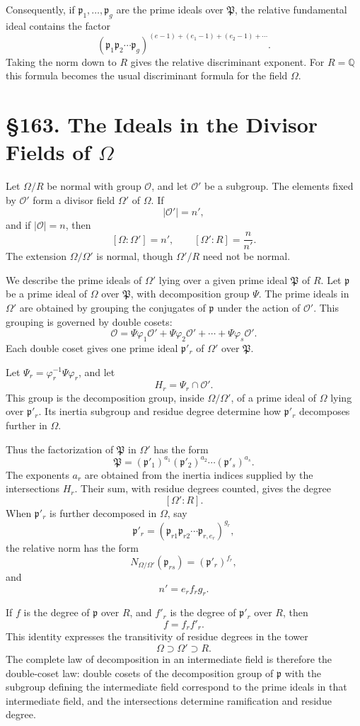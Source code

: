 \documentclass[12pt,a4paper]{article}
\newcommand{\webersection}[2]{\clearpage\section*{\S #1. #2}}
\newcommand{\Pgr}{\mathfrak P}
\newcommand{\p}{\mathfrak p}
\begin{document}
Consequently, if \(\p_1,\ldots,\p_g\) are the prime ideals over \(\Pgr\), the relative fundamental ideal contains the factor
\[
  (\p_1\p_2\cdots\p_g)^{(e-1)+(e_1-1)+(e_2-1)+\cdots}.
\tag{7}
\]
Taking the norm down to \(R\) gives the relative discriminant exponent.  For \(R=\mathbb Q\) this formula becomes the usual discriminant formula for the field \(\Omega\).

\webersection{163}{The Ideals in the Divisor Fields of \(\Omega\)}

Let \(\Omega/R\) be normal with group \(\mathcal O\), and let \(\mathcal O'\) be a subgroup.  The elements fixed by \(\mathcal O'\) form a divisor field \(\Omega'\) of \(\Omega\).  If
\[
  |\mathcal O'|=n',
\]
and if \(|\mathcal O|=n\), then
\[
  [\Omega:\Omega']=n',\qquad [\Omega':R]=\frac n{n'}.
\]
The extension \(\Omega/\Omega'\) is normal, though \(\Omega'/R\) need not be normal.

We describe the prime ideals of \(\Omega'\) lying over a given prime ideal \(\Pgr\) of \(R\).  Let \(\p\) be a prime ideal of \(\Omega\) over \(\Pgr\), with decomposition group \(\Psi\).  The prime ideals in \(\Omega'\) are obtained by grouping the conjugates of \(\p\) under the action of \(\mathcal O'\).  This grouping is governed by double cosets:
\[
  \mathcal O
     =\Psi\varphi_1\mathcal O'
      +\Psi\varphi_2\mathcal O'
      +\cdots+
       \Psi\varphi_s\mathcal O'.
\tag{1}
\]
Each double coset gives one prime ideal \(\p'_r\) of \(\Omega'\) over \(\Pgr\).

Let \(\Psi_r=\varphi_r^{-1}\Psi\varphi_r\), and let
\[
  H_r=\Psi_r\cap\mathcal O'.
\]
This group is the decomposition group, inside \(\Omega/\Omega'\), of a prime ideal of \(\Omega\) lying over \(\p'_r\).  Its inertia subgroup and residue degree determine how \(\p'_r\) decomposes further in \(\Omega\).

Thus the factorization of \(\Pgr\) in \(\Omega'\) has the form
\[
  \Pgr=(\p'_1)^{a_1}(\p'_2)^{a_2}\cdots(\p'_s)^{a_s}.
\tag{2}
\]
The exponents \(a_r\) are obtained from the inertia indices supplied by the intersections \(H_r\).  Their sum, with residue degrees counted, gives the degree
\[
  [\Omega':R].
\]
When \(\p'_r\) is further decomposed in \(\Omega\), say
\[
  \p'_r=(\p_{r1}\p_{r2}\cdots\p_{r,e_r})^{g_r},
\tag{3}
\]
the relative norm has the form
\[
  N_{\Omega/\Omega'}(\p_{rs})=(\p'_r)^{f_r},
\tag{4}
\]
and
\[
  n'=e_r f_r g_r.
\tag{5}
\]

If \(f\) is the degree of \(\p\) over \(R\), and \(f'_r\) is the degree of \(\p'_r\) over \(R\), then
\[
  f=f_r f'_r.
\tag{6}
\]
This identity expresses the transitivity of residue degrees in the tower
\[
  \Omega\supset\Omega'\supset R.
\]
The complete law of decomposition in an intermediate field is therefore the double-coset law: double cosets of the decomposition group of \(\p\) with the subgroup defining the intermediate field correspond to the prime ideals in that intermediate field, and the intersections determine ramification and residue degree.
\end{document}
